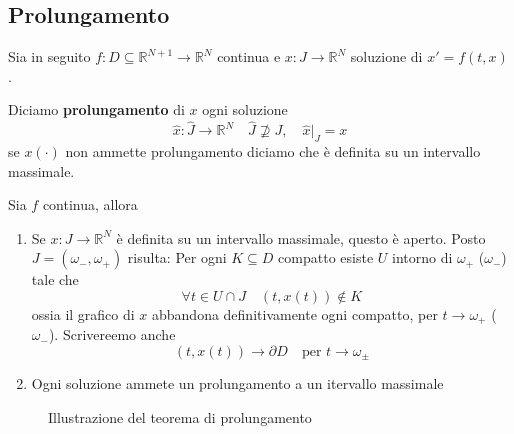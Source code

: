 \subsection{Prolungamento}
Sia in seguito \(f : D\subseteq \mathbb{R}^{N+1} \to \mathbb{R}^{N} \) continua
e \(x : J \to \mathbb{R}^{N}\) soluzione di \(x' = f(t, x)\).

\begin{definition}
    Diciamo \textbf{prolungamento} di \(x\) ogni soluzione
    \[
        \hat{x} : \hat{J} \to \mathbb{R}^{N} \quad \hat{J} \not\supseteq J,
        \quad \hat{x}|_J = x
    \]
    se \(x(\cdot )\) non ammette prolungamento diciamo che è definita su un
    intervallo massimale.
\end{definition}
\begin{theorem}[Prolungamento]\label{th:prolungamento}
    Sia \(f\) continua, allora
\begin{enumerate}[label = \alph*)]
    \item Se \(x : J \to \mathbb{R}^{N}\) è definita su un intervallo massimale,
        questo è aperto. Posto \(J = (\omega_-, \omega_+)\) risulta:
        Per ogni \(K \subseteq D \) compatto esiste \(U\) intorno di
        \(\omega_+\) (\(\omega_-\)) tale che
        \[
            \forall t \in U \cap J \quad (t, x(t)) \not\in K
        \]
        ossia il grafico di \(x\) abbandona definitivamente ogni compatto, per
        \(t \to \omega_+ \) (\(\omega_-\)). Scrivereemo anche
        \[
            (t, x(t)) \to \partial D \quad \text{per } t \to \omega_{\pm} 
        \]
    \item Ogni soluzione ammete un prolungamento a un itervallo massimale

\end{enumerate}
\end{theorem}

\begin{figure}[ht]
    \centering
    \caption{Illustrazione del teorema di prolungamento}\label{fig:proprieta_massimale}
\end{figure}


